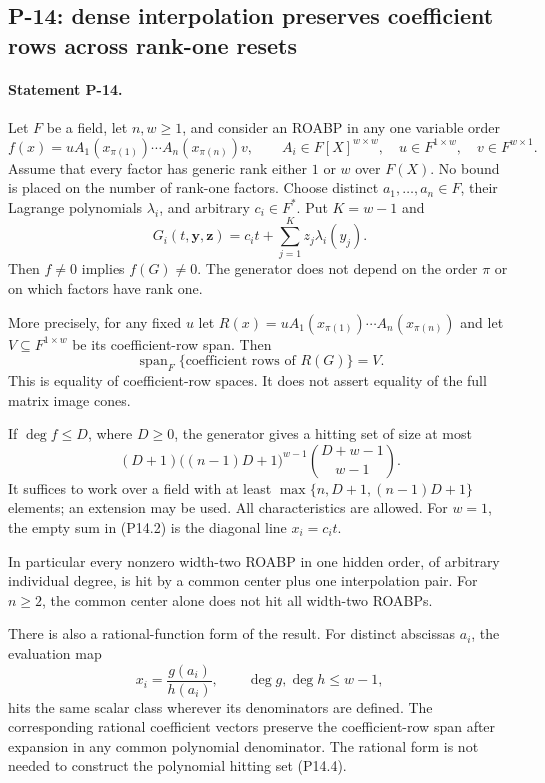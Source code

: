 \subsection{P-14: dense interpolation preserves coefficient rows across rank-one resets}
\paragraph{Statement P-14.}
Let $F$ be a field, let $n,w\geq1$, and consider an ROABP in any
one variable order
\[
 f(x)=uA_1(x_{\pi(1)})\cdots A_n(x_{\pi(n)})v,
 \qquad A_i\in F[X]^{w\times w},\quad
 u\in F^{1\times w},\quad v\in F^{w\times1}.
 \tag{P14.1}
\]
Assume that every factor has generic rank either $1$ or $w$ over
$F(X)$. No bound is placed on the number of rank-one factors.
Choose distinct $a_1,\ldots,a_n\in F$, their Lagrange polynomials
$\lambda_i$, and arbitrary $c_i\in F^*$. Put $K=w-1$ and
\[
 G_i(t,\mathbf y,\mathbf z)
       =c_it+\sum_{j=1}^{K}z_j\lambda_i(y_j).
 \tag{P14.2}
\]
Then $f\ne0$ implies $f(G)\ne0$. The generator does not depend
on the order $\pi$ or on which factors have rank one.

More precisely, for any fixed $u$ let
$R(x)=uA_1(x_{\pi(1)})\cdots A_n(x_{\pi(n)})$ and let
$V\subseteq F^{1\times w}$ be its coefficient-row span. Then
\[
 \operatorname{span}_F\{\text{coefficient rows of }R(G)\}=V.
 \tag{P14.3}
\]
This is equality of coefficient-row spaces. It does not assert
equality of the full matrix image cones.

If $\deg f\leq D$, where $D\geq0$, the generator gives a hitting
set of size at most
\[
 (D+1)\bigl((n-1)D+1\bigr)^{w-1}
             \binom{D+w-1}{w-1}.
 \tag{P14.4}
\]
It suffices to work over a field with at least
$\max\{n,D+1,(n-1)D+1\}$ elements; an extension may be used.
All characteristics are allowed. For $w=1$, the empty sum in
(P14.2) is the diagonal line $x_i=c_it$.

In particular every nonzero width-two ROABP in one hidden order,
of arbitrary individual degree, is hit by a common center plus
one interpolation pair. For $n\geq2$, the common center alone
does not hit all width-two ROABPs.

There is also a rational-function form of the result. For distinct
abscissas $a_i$, the evaluation map
\[
 x_i=\frac{g(a_i)}{h(a_i)},\qquad
 \deg g,\deg h\leq w-1,
 \tag{P14.5}
\]
hits the same scalar class wherever its denominators are defined.
The corresponding rational coefficient vectors preserve the
coefficient-row span after expansion in any common polynomial
denominator. The rational form is not needed to construct the
polynomial hitting set (P14.4).

